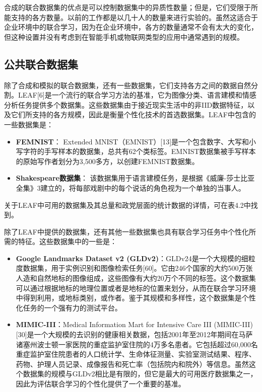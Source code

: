合成的联合数据集的优点是可以控制数据集中的异质性数量；但是，它们受限于所能支持的各方数量。以前的工作都是以几十人的数量来进行实验的。虽然这适合于企业环境中的联合学习，因为在企业环境中，各方的数量通常不会有太大的变化，但这种设置并没有考虑到在智能手机或物联网类型的应用中通常遇到的规模。

\subsection{公共联合数据集}
除了合成和模拟的联合数据集，还有一些数据集，它们支持各方之间的数据自然分割。LEAF[6]是一个流行的联合学习方法的基准，它为图像分类、语言建模和情感分析任务提供多个数据集。这些数据集由于接近现实生活中的非IID数据特征，以及它们所支持的各方规模，因此是衡量个性化技术的首选数据集。LEAF中包含的一些数据集是：
\begin{itemize}
	\item \textbf{FEMNIST}： Extended MNIST（EMNIST）[13]是一个包含数字、大写和小写字符的手写样本的数据集，总共有62个类标签。EMNIST数据集被手写样本的原始写作者划分为3,500多方，以创建FEMNIST数据集。
	\item \textbf{Shakespeare数据集}： 该数据集用于语言建模任务，是根据《威廉-莎士比亚全集》3建立的，将每部戏剧中的每个说话的角色视为一个单独的当事人。
\end{itemize}

关于LEAF中可用的数据集及其总量和政党层面的统计数据的详情，可在表4.2中找到。

除了LEAF中提供的数据集，还有其他一些数据集也具有联合学习任务中个性化所需的特征。这些数据集中的一些是：

\begin{itemize}
	\item \textbf{Google Landmarks Dataset v2 (GLDv2)}：GLDv24是一个大规模的细粒度数据集，用于实例识别和图像检索任务[60]。它由246个国家的大约500万张人造和自然地标的图像组成，这些图像有大约20万个不同的标签。这个数据集可以通过根据地标的地理位置或者是地标的位置来划分，从而在联合学习环境中得到利用，或地标类别，或作者。鉴于其规模和多样性，这个数据集是个性化任务的一个强有力的测试平台。
	\item \textbf{MIMIC-III}：Medical Information Mart for Intensive Care III (MIMIC-III) [30]是一个大规模的去识别的健康相关数据，包括2001年至2012年期间在马萨诸塞州波士顿一家医院的重症监护室住院的4万多名患者。它包括超过60,000名重症监护室住院患者的人口统计学、生命体征测量、实验室测试结果、程序、药物、护理人员记录、成像报告和死亡率（包括院内和院外）等信息。虽然这个数据集的规模与GLDv2相比是有限的，但它是最大的可用医疗数据集之一，因此为评估联合学习的个性化提供了一个重要的基准。
\end{itemize}

